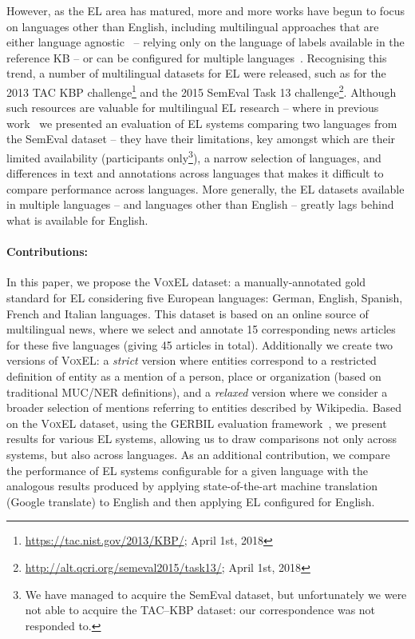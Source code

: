 \documentclass{llncs}
\begin{document}
However, as the EL area has matured, more and more works have begun to focus on languages other than English, including multilingual approaches that are either language agnostic~\cite{THD-dojchinovski2012recognizing,daiber2013improving,ferragina2010tagme,mag2017} -- relying only on the language of labels available in the reference KB -- or can be configured for multiple languages~\cite{Babelfy-moro2014entity,freme-ner2016}. Recognising this trend, a number of multilingual datasets for EL were released, such as for the 2013 TAC KBP challenge\footnote{\url{https://tac.nist.gov/2013/KBP/}; April 1st, 2018} %
and the 2015 SemEval Task 13 challenge\footnote{\url{http://alt.qcri.org/semeval2015/task13/}; April 1st, 2018}. Although such resources are valuable for multilingual EL research -- where in previous work~\cite{Rosales-MendezP17} we presented an evaluation of EL systems comparing two languages from the SemEval dataset -- they have their limitations, key amongst which are their limited availability (participants only\footnote{We have managed to acquire the SemEval dataset, but unfortunately we were not able to acquire the TAC--KBP dataset: our correspondence was not responded to.}), a narrow selection of languages, and differences in text and annotations across languages that makes it difficult to compare performance across languages. More generally, the EL datasets available in multiple languages -- and languages other than English -- greatly lags behind what is available for English.

\paragraph{Contributions:} In this paper, we propose the \textsc{VoxEL} dataset: a manually-annotated gold standard for EL considering five European languages: German, English, Spanish, French and Italian languages. This dataset is based on an online source of multilingual news, where we select and annotate 15 corresponding news articles for these five languages (giving 45 articles in total). Additionally we create two versions of \textsc{VoxEL}: a \textit{strict} version where entities correspond to a restricted definition of entity as a mention of a person, place or organization (based on traditional MUC/NER definitions), and a \textit{relaxed} version where we consider a broader selection of mentions referring to entities described by Wikipedia. Based on the \textsc{VoxEL} dataset, using the GERBIL evaluation framework~\cite{gerbil-2015}, we present results for various EL systems, allowing us to draw comparisons not only across systems, but also across languages. As an additional contribution, we compare the performance of EL systems configurable for a given language with the analogous results produced by applying state-of-the-art machine translation (Google translate) to English and then applying EL configured for English.
\end{document}
